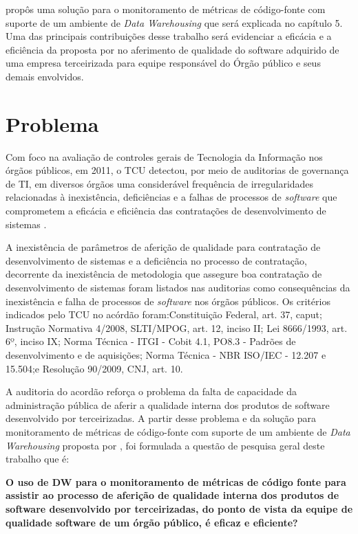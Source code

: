 \cite{rego_monitoramento_2014} propôs uma solução para o monitoramento de métricas de código-fonte com suporte de um ambiente de \textit{Data Warehousing} que será explicada no capítulo 5. Uma das principais contribuições desse trabalho será evidenciar a eficácia e a eficiência da proposta por  no aferimento de qualidade do software adquirido de uma empresa terceirizada para equipe responsável do Órgão público e seus demais envolvidos.

\section{Problema}
\label{sec:problema} 

Com foco na avaliação de controles gerais de Tecnologia da Informação nos órgãos públicos, em 2011, o TCU detectou, por meio de auditorias de governança de TI, em diversos órgãos uma considerável frequência de irregularidades relacionadas à inexistência, deficiências e a falhas de processos de \textit{software} que comprometem a eficácia e eficiência das contratações de desenvolvimento de sistemas \cite{Acordao381_2011}. 

A inexistência de parâmetros de aferição de qualidade para contratação de desenvolvimento de sistemas e a deficiência no processo de contratação, decorrente da inexistência de metodologia que assegure boa contratação de desenvolvimento de sistemas foram listados nas auditorias como consequências da inexistência e falha de processos de \textit{software} nos órgãos públicos. Os critérios indicados pelo TCU no acórdão \cite{Acordao381_2011} foram:Constituição Federal, art. 37, caput; Instrução Normativa 4/2008, SLTI/MPOG, art. 12, inciso II; Lei 8666/1993, art. 6º, inciso IX; Norma Técnica - ITGI - Cobit 4.1, PO8.3 - Padrões de desenvolvimento e de aquisições; Norma Técnica - NBR ISO/IEC - 12.207 e 15.504;e Resolução 90/2009, CNJ, art. 10. 

A auditoria do acordão \cite{Acordao381_2011} reforça o problema da falta de capacidade da administração pública de aferir a qualidade interna dos produtos de software desenvolvido por terceirizadas. A partir desse problema e da solução para monitoramento de métricas de código-fonte com suporte de um ambiente de \textit{Data Warehousing} proposta por  , foi formulada a questão de pesquisa geral deste trabalho que é:

\textbf{O uso de DW para o monitoramento de métricas de código fonte para assistir ao processo de aferição de qualidade interna dos produtos de software desenvolvido por terceirizadas, do ponto de vista da equipe de qualidade software de um órgão público, é eficaz e eficiente?}


